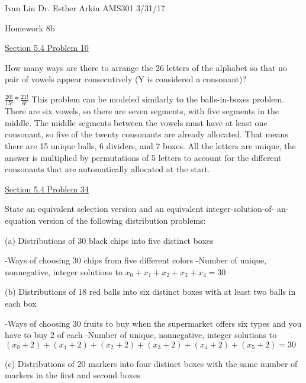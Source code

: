 \documentclass{article}
\begin{document}
Ivan Lin\newline{}
Dr. Esther Arkin\newline{}
AMS301\newline{}
3/31/17

\begin{center}
  Homework 8b
\end{center}

\underline{Section 5.4 Problem 10}\newline{}

How many ways are there to arrange the 26 letters of the alphabet so that no pair
of vowels appear consecutively (Y is considered a consonant)?

$\frac{20!}{15!}*\frac{21!}{6!}$ This problem can be modeled similarly to the balls-in-boxes problem. There are six vowels, so there are seven segments, with five segments in the middle. The middle segments between the vowels must have at least one consonant, so five of the twenty consonants are already allocated. That means there are 15 unique balls, 6 dividers, and 7 boxes. All the letters are unique, the answer is multiplied by permutations of 5 letters to account for the different consonants that are automatically allocated at the start.

\underline{Section 5.4 Problem 34}\newline{}

State an equivalent selection version and an equivalent integer-solution-of-
an-equation version of the following distribution problems:\newline{}

(a) Distributions of 30 black chips into five distinct boxes\newline{}

-Ways of choosing 30 chips from five different colors\newline{}
-Number of unique, nonnegative, integer solutions to $x_0+x_1+x_2+x_3+x_4=30$\newline{} 

(b) Distributions of 18 red balls into six distinct boxes with at least two balls in
each box

-Ways of choosing 30 fruits to buy when the supermarket offers six types and you have to buy 2 of each\newline{}
-Number of unique, nonnegative, integer solutions to $(x_0+2)+(x_1+2)+(x_2+2)+(x_3+2)+(x_4+2)+(x_5+2)=30$\newline{}

(c) Distributions of 20 markers into four distinct boxes with the same number
of markers in the first and second boxes
\end{document}
